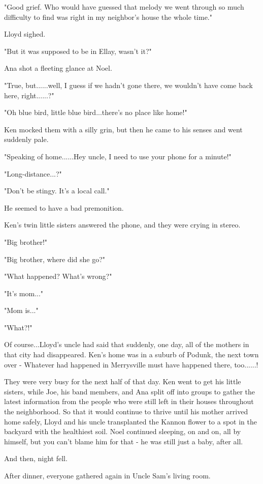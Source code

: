 \documentclass[
]{article}
\begin{document}
"Good grief. Who would have guessed that melody we went through so much
difficulty to find was right in my neighbor's house the whole time."

Lloyd sighed.

"But it was supposed to be in Ellay, wasn't it?"

Ana shot a fleeting glance at Noel.

"True, but......well, I guess if we hadn't gone there, we wouldn't have
come back here, right......?"

"Oh blue bird, little blue bird...there's no place like home!"

Ken mocked them with a silly grin, but then he came to his senses and
went suddenly pale.

"Speaking of home......Hey uncle, I need to use your phone for a
minute!"

"Long-distance...?"

"Don't be stingy. It's a local call."

He seemed to have a bad premonition.

Ken's twin little sisters answered the phone, and they were crying in
stereo.

"Big brother!"

"Big brother, where did she go?"

"What happened? What's wrong?"

"It's mom..."

"Mom is..."

"What?!"

Of course...Lloyd's uncle had said that suddenly, one day, all of the
mothers in that city had disappeared. Ken's home was in a suburb of
Podunk, the next town over - Whatever had happened in Merrysville must
have happened there, too......!

They were very busy for the next half of that day. Ken went to get his
little sisters, while Joe, his band members, and Ana split off into
groups to gather the latest information from the people who were still
left in their houses throughout the neighborhood. So that it would
continue to thrive until his mother arrived home safely, Lloyd and his
uncle transplanted the Kannon flower to a spot in the backyard with the
healthiest soil. Noel continued sleeping, on and on, all by himself, but
you can't blame him for that - he was still just a baby, after all.

And then, night fell.

After dinner, everyone gathered again in Uncle Sam's living room.
\end{document}
